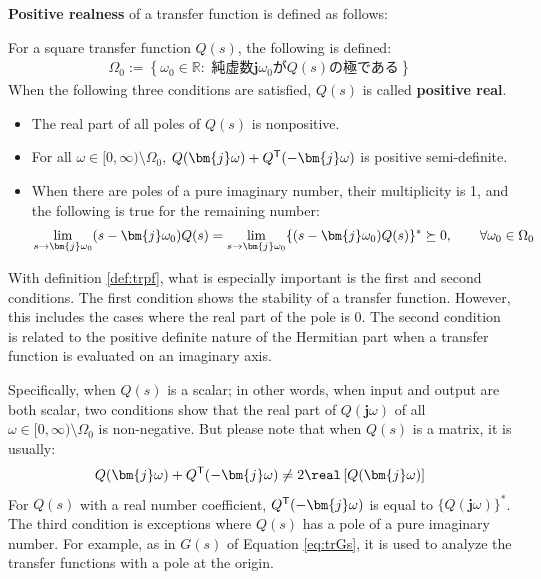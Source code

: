 \documentclass[tombow,dvipdfmx]{corona-a5-1.1}
\begin{document}
\textbf{Positive realness} of a transfer function is defined as follows:

\begin{定義}\label{def:trpf}
For a square transfer function $Q(s)$, the following is defined:
\begin{align}\label{eq:defOm0}
\Omega_0 := \left\{
\omega_0 \in \mathbb{R}: 
\mbox{ 純虚数$\bm{j} \omega_0$が$Q(s)$の極である}
\right\}
\end{align}
When the following three conditions are satisfied, $Q(s)$ is called \textbf{positive real}.
\begin{itemize}
\item The real part of all poles of $Q(s)$ is nonpositive.
\item For all $\omega \in [0,\infty)\setminus \Omega_0$, $Q(\bm{j} \omega) + Q^{\sf T}(-\bm{j} \omega)$ is positive semi-definite.
\item When there are poles of a pure imaginary number, their multiplicity is 1, and the following is true for the remaining number: 
\begin{align*}
\lim_{s \rightarrow \bm{j} \omega_0} (s-\bm{j} \omega_0) Q(s) = \lim_{s\rightarrow \bm{j} \omega_0} \{ (s-\bm{j} \omega_0) Q(s)\}^{\sf *}\succeq 0
,\qquad
\forall \omega_0 \in \Omega_0
\end{align*}
\end{itemize}
\end{定義}


With definition \ref{def:trpf}, what is especially important is the first and second conditions.
The first condition shows the stability of a transfer function.
However, this includes the cases where the real part of the pole is 0.
The second condition is related to the positive definite nature of the Hermitian part when a transfer function is evaluated on an imaginary axis.

Specifically, when $Q(s)$ is a scalar; in other words, when input and output are both scalar, two conditions show that the real part of $Q(\bm{j}\omega)$ of all $\omega \in [0,\infty)\setminus \Omega_0$ is non-negative.
But please note that when $Q(s)$ is a matrix, it is usually:
\begin{align*}
Q(\bm{j} \omega) + Q^{\sf T}(-\bm{j} \omega) \neq 2 \real\left[ Q(\bm{j} \omega) \right]
\end{align*}
For $Q(s)$ with a real number coefficient, $Q^{\sf T}( -\bm{j} \omega)$ is equal to $\{Q(\bm{j} \omega)\}^*$.
The third condition is exceptions where $Q(s)$ has a pole of a pure imaginary number.
For example, as in $G(s)$ of Equation \ref{eq:trGs}, it is used to analyze the transfer functions with a pole at the origin.
\end{document}
